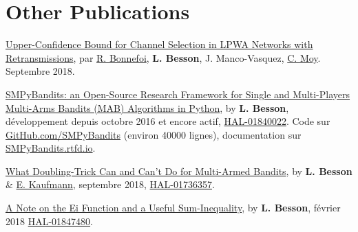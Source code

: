 \section*{Other Publications}
\renewcommand{\labelenumi}{[OP-\arabic{enumi}]}
\begin{etaremune}
\item
	\href{https://perso.crans.org/besson/articles/BMBBM__IEEE_WCNC__2019.pdf}{Upper-Confidence
	Bound for Channel Selection in LPWA Networks with Retransmissions},
	par \href{https://remibonnefoi.wordpress.com/}{R. Bonnefoi}, \textbf{L. Besson}, J.
	Manco-Vasquez,
	\href{https://moychris.wordpress.com/}{C. Moy}. Septembre 2018.
\item
	\href{https://hal.inria.fr/hal-01840022/document}{SMPyBandits: an
	Open-Source Research Framework for Single and Multi-Players Multi-Arms
	Bandits (MAB) Algorithms in Python}, by \textbf{L. Besson},
	développement depuis octobre 2016 et encore actif,
	\href{https://hal.inria.fr/hal-01840022}{HAL-01840022}. Code sur
	\href{https://GitHub.com/SMPyBandits/SMPyBandits}{GitHub.com/SMPyBandits}
	(environ 40000 lignes), documentation sur
	\href{https://SMPyBandits.rtfd.io}{SMPyBandits.rtfd.io}.
\item
	\href{https://hal.inria.fr/hal-01736357/document}{What Doubling-Trick
	Can and Can't Do for Multi-Armed Bandits}, by \textbf{L. Besson} \&
	\href{http://chercheurs.lille.inria.fr/ekaufman/research.html}{E.
	Kaufmann}, septembre 2018,
	\href{https://hal.inria.fr/hal-01736357}{HAL-01736357}.
\item
	\href{https://hal.inria.fr/hal-01847480/document}{A Note on the Ei
	Function and a Useful Sum-Inequality}, by \textbf{L. Besson}, février
	2018 \href{https://hal.inria.fr/hal-01847480}{HAL-01847480}.
\end{etaremune}


